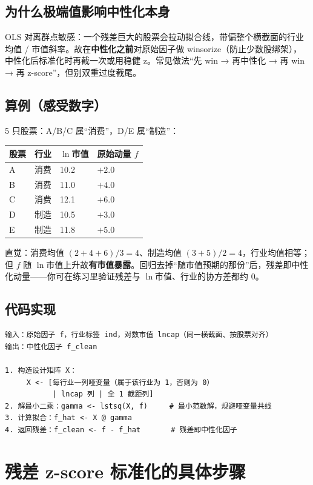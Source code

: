 \documentclass[UTF8,11pt]{ctexart}
\begin{document}
\subsection{为什么极端值影响中性化本身}
OLS 对离群点敏感：一个残差巨大的股票会拉动拟合线，带偏整个横截面的行业均值 / 市值斜率。故在\textbf{中性化之前}对原始因子做 winsorize（防止少数股绑架），中性化后标准化时再截一次或用稳健 z。常见做法“先 win → 再中性化 → 再 win → 再 z-score”，但别双重过度截尾。

\subsection{算例（感受数字）}
5 只股票：A/B/C 属“消费”，D/E 属“制造”：
\begin{center}
\renewcommand{\arraystretch}{1.3}
\begin{tabular}{@{}llll@{}}
\toprule
股票 & 行业 & $\ln$市值 & 原始动量 $f$ \\
\midrule
A & 消费 & 10.2 & $+2.0$ \\
B & 消费 & 11.0 & $+4.0$ \\
C & 消费 & 12.1 & $+6.0$ \\
D & 制造 & 10.5 & $+3.0$ \\
E & 制造 & 11.8 & $+5.0$ \\
\bottomrule
\end{tabular}
\end{center}
直觉：消费均值 $(2+4+6)/3=4$、制造均值 $(3+5)/2=4$，行业均值相等；但 $f$ 随 $\ln$市值上升故\textbf{有市值暴露}。回归去掉“随市值预期的那份”后，残差即中性化动量——你可在练习里验证残差与 $\ln$市值、行业的协方差都约 $0$。

\subsection{代码实现}
\begin{lstlisting}[language={},caption={行业 + 市值中性化（伪代码）}]
输入：原始因子 f，行业标签 ind，对数市值 lncap（同一横截面、按股票对齐）
输出：中性化因子 f_clean

1. 构造设计矩阵 X：
     X <- [每行业一列哑变量（属于该行业为 1，否则为 0）
           | lncap 列 | 全 1 截距列]
2. 解最小二乘：gamma <- lstsq(X, f)     # 最小范数解，规避哑变量共线
3. 计算拟合：f_hat <- X @ gamma
4. 返回残差：f_clean <- f - f_hat       # 残差即中性化因子
\end{lstlisting}

\section{残差 z-score 标准化的具体步骤}
\end{document}

